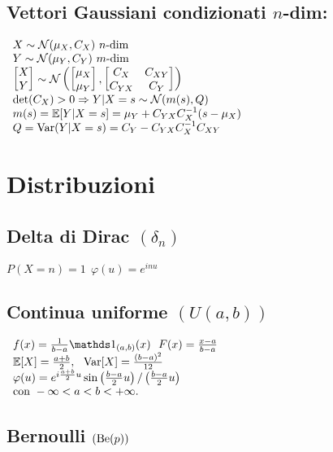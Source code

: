 \subsection{Vettori Gaussiani condizionati $n$-dim:}

$ \begin{array}{l}
X\sim \mathcal N( \mu_X ,C_X) \ n\text{-dim}\\
Y\sim \mathcal N( \mu_Y ,C_Y) \ m\text{-dim}\\
\begin{bmatrix}
X\\
Y
\end{bmatrix} \sim \mathcal N\left(\begin{bmatrix}
\mu_X\\
\mu_Y
\end{bmatrix} ,\begin{bmatrix}
C_X & C_{XY}\\
C_{YX} & C_Y
\end{bmatrix}\right)\\
\operatorname{det}( C_X) >0\Rightarrow Y|X=s\sim \mathcal N (m(s),Q)\\
m(s)=\mathbb E[Y|X=s]=\mu_Y +C_{YX} C^{-1}_X( s-\mu_X)\\
Q=\operatorname{Var}(Y|X=s)=C_Y -C_{YX} C^{-1}_X C_{XY}
\end{array}$
\section{Distribuzioni}
\subsection{Delta di Dirac $( \delta_n)$}

$P(X=n)=1\ \ \varphi (u)=e^{inu}$
\subsection{Continua uniforme $(U(a,b))$}

$ \begin{array}{l}
f(x)=\frac{1}{b-a}\Ind_{(a,b)} (x)\ \ F(x)=\frac{x-a}{b-a}\\
\EE[X]=\frac{a+b}{2} ,\ \ \Var[X]=\frac{(b-a)^2}{12}\\
\varphi (u)=e^{i\frac{a+b}{2} u}\sin\left(\frac{b-a}{2} u\right) /\left(\frac{b-a}{2} u\right)\\
\text{con} \ -\infty < a< b< +\infty .
\end{array}$
\subsection{Bernoulli $(\operatorname{Be} (p))$}

